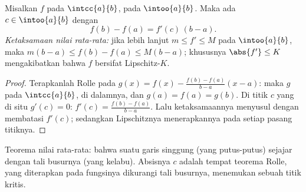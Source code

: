 \begin{theorem}\label{thm:b1:derivative:mvt}
Misalkan $f$  pada $\intcc{a}{b}$,  pada
$\intoo{a}{b}$. Maka ada $c \in \intoo{a}{b}$ dengan
\[
f(b) - f(a) = f'(c)\,(b - a) .
\]
\emph{Ketaksamaan nilai rata-rata:} jika lebih lanjut $m \leq f' \leq M$ pada
$\intoo{a}{b}$, maka $m(b-a) \leq f(b) - f(a) \leq M(b-a)$;
khususnya $\abs{f'} \leq K$ mengakibatkan bahwa $f$ bersifat Lipschitz-$K$.
\end{theorem}

\begin{proof}
Terapkanlah Rolle pada $g(x) = f(x) - \frac{f(b) - f(a)}{b - a}(x - a)$: maka $g$
 pada $\intcc{a}{b}$,  di dalamnya, dan $g(a) =
f(a) = g(b)$. Di titik $c$ yang di situ $g'(c) = 0$: $f'(c) =
\frac{f(b)-f(a)}{b-a}$. Lalu ketaksamaannya menyusul dengan membatasi $f'(c)$;
sedangkan  Lipschitznya menerapkannya pada setiap pasang titiknya.
\end{proof}

\begin{omfigure}

{\small Teorema nilai rata-rata: bahwa suatu garis singgung (yang putus-putus) sejajar dengan
tali busurnya (yang kelabu). Absisnya $c$ adalah tempat teorema Rolle, yang diterapkan
pada fungsinya dikurangi tali busurnya, menemukan sebuah titik kritis.}
\end{omfigure}

